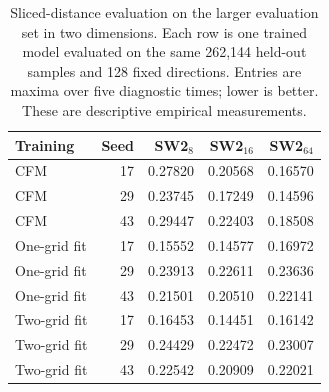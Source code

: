 \begin{table}[t]
\centering
\caption{Sliced-distance evaluation on the larger evaluation set in two dimensions. Each row is one trained model evaluated on the same 262,144 held-out samples and 128 fixed directions. Entries are maxima over five diagnostic times; lower is better. These are descriptive empirical measurements.}
\label{tab:large-bank}
\small
\begin{tabular}{@{}lrrrr@{}}
\toprule
Training & Seed & SW2$_8$ & SW2$_{16}$ & SW2$_{64}$\\
\midrule
CFM & 17 & 0.27820 & 0.20568 & 0.16570\\
CFM & 29 & 0.23745 & 0.17249 & 0.14596\\
CFM & 43 & 0.29447 & 0.22403 & 0.18508\\
One-grid fit & 17 & 0.15552 & 0.14577 & 0.16972\\
One-grid fit & 29 & 0.23913 & 0.22611 & 0.23636\\
One-grid fit & 43 & 0.21501 & 0.20510 & 0.22141\\
Two-grid fit & 17 & 0.16453 & 0.14451 & 0.16142\\
Two-grid fit & 29 & 0.24429 & 0.22472 & 0.23007\\
Two-grid fit & 43 & 0.22542 & 0.20909 & 0.22021\\
\bottomrule
\end{tabular}
\end{table}

